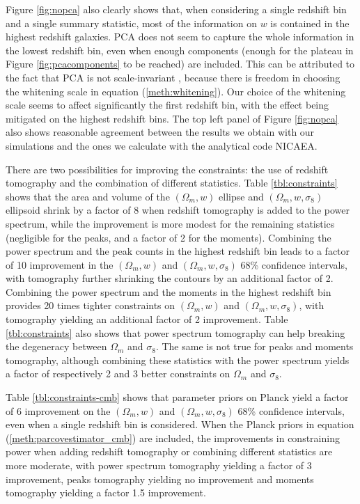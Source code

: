 \documentclass[reprint,aps,prd,superscriptaddress,showkeys,showpacs]{revtex4-1}
\begin{document}
Figure \ref{fig:nopca} also clearly shows that, when considering a single redshift bin and a single summary statistic, most of the information on $w$ is contained in the highest redshift galaxies. PCA does not seem to capture the whole information in the lowest redshift bin, even when enough components (enough for the plateau in Figure \ref{fig:pcacomponents} to be reached) are included. This can be attributed to the fact that PCA is not scale-invariant \citep{astroMLText}, because there is freedom in choosing the whitening scale in equation (\ref{meth:whitening}). Our choice of the whitening scale seems to affect significantly the first redshift bin, with the effect being mitigated on the highest redshift bins. 
The top left panel of Figure \ref{fig:nopca} also shows reasonable agreement between the results we obtain with our simulations and the ones we calculate with the analytical code NICAEA. 

There are two possibilities for improving the constraints: the use of redshift tomography and the combination of different statistics. Table \ref{tbl:constraints} shows that the area and volume of the $(\Omega_m,w)$ ellipse and $(\Omega_m,w,\sigma_8)$ ellipsoid shrink by a factor of 8 when redshift tomography is added to the power spectrum, while the improvement is more modest for the remaining statistics (negligible for the peaks, and a factor of 2 for the moments). Combining the power spectrum and the peak counts in the highest redshift bin leads to a factor of 10 improvement in the $(\Omega_m,w)$ and $(\Omega_m,w,\sigma_8)$ 68\% confidence intervals, with tomography further shrinking the contours by an additional factor of 2. Combining the power spectrum and the moments in the highest redshift bin provides 20 times tighter constraints on $(\Omega_m,w)$ and $(\Omega_m,w,\sigma_8)$, with tomography yielding an additional factor of 2 improvement. Table \ref{tbl:constraints} also shows that power spectrum tomography can help breaking the degeneracy between $\Omega_m$ and $\sigma_8$. The same is not true for peaks and moments tomography, although combining these statistics with the power spectrum yields a factor of respectively 2 and 3 better constraints on $\Omega_m$ and $\sigma_8$. 

Table \ref{tbl:constraints-cmb} shows that parameter priors on Planck yield a factor of 6 improvement on the $(\Omega_m,w)$ and $(\Omega_m,w,\sigma_8)$ 68\% confidence intervals, even when a single redshift bin is considered. When the Planck priors in equation (\ref{meth:parcovestimator_cmb}) are included, the improvements in constraining power when adding redshift tomography or combining different statistics are more moderate, with power spectrum tomography yielding a factor of 3 improvement, peaks tomography yielding no improvement and moments tomography yielding a factor 1.5 improvement. 
\end{document}
